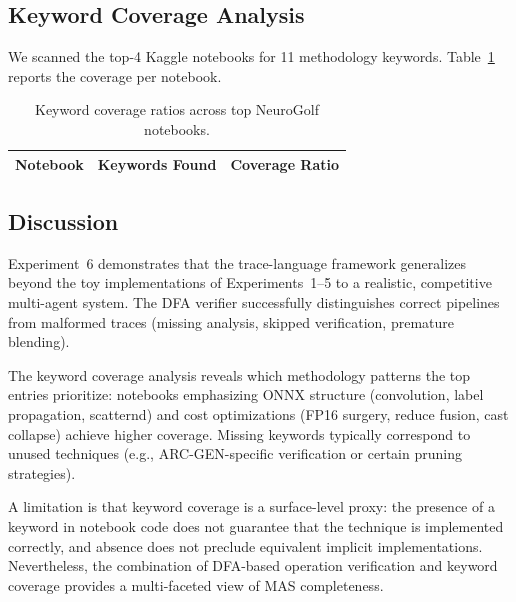 \subsection{Keyword Coverage Analysis}
\label{sec:exp6-keywords}

We scanned the top-4 Kaggle notebooks for 11 methodology keywords.
Table~\ref{tab:exp6-keywords} reports the coverage per notebook.

\begin{table}[htbp]
\centering
\caption{Keyword coverage ratios across top NeuroGolf notebooks.}
\label{tab:exp6-keywords}
\small
\begin{tabular}{lcc}
\toprule
Notebook & Keywords Found & Coverage Ratio \\
\midrule
\bottomrule
\end{tabular}
\end{table}

\subsection{Discussion}
\label{sec:exp6-discussion}

Experiment~6 demonstrates that the trace-language framework generalizes
beyond the toy implementations of Experiments~1--5 to a realistic,
competitive multi-agent system. The DFA verifier successfully distinguishes
correct pipelines from malformed traces (missing analysis, skipped
verification, premature blending).

The keyword coverage analysis reveals which methodology patterns the top
entries prioritize: notebooks emphasizing ONNX structure (convolution,
label propagation, scatternd) and cost optimizations (FP16 surgery, reduce
fusion, cast collapse) achieve higher coverage. Missing keywords typically
correspond to unused techniques (e.g., ARC-GEN-specific verification or
certain pruning strategies).

A limitation is that keyword coverage is a surface-level proxy: the presence
of a keyword in notebook code does not guarantee that the technique is
implemented correctly, and absence does not preclude equivalent implicit
implementations. Nevertheless, the combination of DFA-based operation
verification and keyword coverage provides a multi-faceted view of MAS
completeness.

